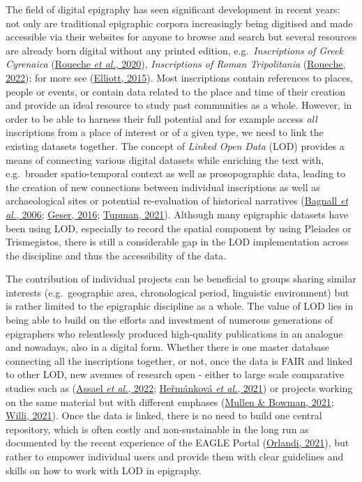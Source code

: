 \documentclass[
  12pt,
]{scrreprt}
\begin{document}
The field of digital epigraphy has seen significant development in
recent years: not only are traditional epigraphic corpora increasingly
being digitised and made accessible via their websites for anyone to
browse and search but several resources are already born digital without
any printed edition, e.g.~\emph{Inscriptions of Greek Cyrenaica}
(\protect\hyperlink{ref-roueche_inscriptions_2020}{Roueche \emph{et
al.}, 2020}), \emph{Inscriptions of Roman Tripolitania}
(\protect\hyperlink{ref-roueche_inscriptions_2022}{Roueche, 2022}); for
more see (\protect\hyperlink{ref-bruun_epigraphy_2015}{Elliott, 2015}).
Most inscriptions contain references to places, people or events, or
contain data related to the place and time of their creation and provide
an ideal resource to study past communities as a whole. However, in
order to be able to harness their full potential and for example access
\emph{all} inscriptions from a place of interest or of a given type, we
need to link the existing datasets together. The concept of \emph{Linked
Open Data} (LOD) provides a means of connecting various digital datasets
while enriching the text with, e.g.~broader spatio-temporal context as
well as prosopographic data, leading to the creation of new connections
between individual inscriptions as well as archaeological sites or
potential re-evaluation of historical narratives
(\protect\hyperlink{ref-bagnall_pleiades_2006}{Bagnall \emph{et al.},
2006}; \protect\hyperlink{ref-geser_wp15_2016}{Geser, 2016};
\protect\hyperlink{ref-tupman_where_2021}{Tupman, 2021}). Although many
epigraphic datasets have been using LOD, especially to record the
spatial component by using Pleiades or Trismegistos, there is still a
considerable gap in the LOD implementation across the discipline and
thus the accessibility of the data.

The contribution of individual projects can be beneficial to groups
sharing similar interests (e.g.~geographic area, chronological period,
linguistic environment) but is rather limited to the epigraphic
discipline as a whole. The value of LOD lies in being able to build on
the efforts and investment of numerous generations of epigraphers who
relentlessly produced high-quality publications in an analogue and
nowadays, also in a digital form. Whether there is one master database
connecting all the inscriptions together, or not, once the data is FAIR
and linked to other LOD, new avenues of research open - either to large
scale comparative studies such as
(\protect\hyperlink{ref-assael_restoring_2022}{Assael \emph{et al.},
2022}; \protect\hyperlink{ref-hermankova_inscriptions_2021}{Heřmánková
\emph{et al.}, 2021}) or projects working on the same material but with
different emphases (\protect\hyperlink{ref-mullen_manual_2021}{Mullen \&
Bowman, 2021}; \protect\hyperlink{ref-willi_manual_2021}{Willi, 2021}).
Once the data is linked, there is no need to build one central
repository, which is often costly and non-sustainable in the long run as
documented by the recent experience of the EAGLE Portal
(\protect\hyperlink{ref-orlandi_digital_2021}{Orlandi, 2021}), but
rather to empower individual users and provide them with clear
guidelines and skills on how to work with LOD in epigraphy.
\end{document}
